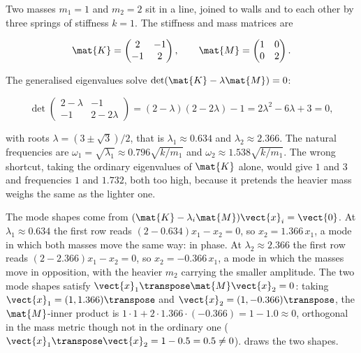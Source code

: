 Two masses $m_{1} = 1$ and $m_{2} = 2$ sit in a line, joined to walls
and to each other by three springs of stiffness $k = 1$. The stiffness
and mass matrices are

\[
\mat{K} = \begin{pmatrix} 2 & -1 \\ -1 & 2 \end{pmatrix}, \qquad
\mat{M} = \begin{pmatrix} 1 & 0 \\ 0 & 2 \end{pmatrix}.
\]

The generalised eigenvalues solve $\det(\mat{K} - \lambda\mat{M}) = 0$:

\[
\det\begin{pmatrix} 2 - \lambda & -1 \\ -1 & 2 - 2\lambda \end{pmatrix}
= (2 - \lambda)(2 - 2\lambda) - 1 = 2\lambda^{2} - 6\lambda + 3 = 0,
\]

with roots $\lambda = (3 \pm \sqrt{3})/2$, that is $\lambda_{1} \approx
0.634$ and $\lambda_{2} \approx 2.366$. The natural frequencies are
$\omega_{1} = \sqrt{\lambda_{1}} \approx 0.796\sqrt{k/m_{1}}$ and
$\omega_{2} \approx 1.538\sqrt{k/m_{1}}$. The wrong shortcut, taking the
ordinary eigenvalues of $\mat{K}$ alone, would give $1$ and $3$ and
frequencies $1$ and $1.732$, both too high, because it pretends the
heavier mass weighs the same as the lighter one.

The mode shapes come from $(\mat{K} - \lambda_{i}\mat{M})\vect{x}_{i} =
\vect{0}$. At $\lambda_{1} \approx 0.634$ the first row reads
$(2 - 0.634)x_{1} - x_{2} = 0$, so $x_{2} = 1.366\,x_{1}$, a mode in
which both masses move the same way: in phase. At $\lambda_{2} \approx
2.366$ the first row reads $(2 - 2.366)x_{1} - x_{2} = 0$, so $x_{2} =
-0.366\,x_{1}$, a mode in which the masses move in opposition, with the
heavier $m_{2}$ carrying the smaller amplitude. The two mode shapes
satisfy $\vect{x}_{1}\transpose\mat{M}\vect{x}_{2} = 0$: taking
$\vect{x}_{1} = (1, 1.366)\transpose$ and $\vect{x}_{2} = (1,
-0.366)\transpose$, the $\mat{M}$-inner product is $1 \cdot 1 + 2 \cdot
1.366 \cdot (-0.366) = 1 - 1.0 \approx 0$, orthogonal in the mass
metric though not in the ordinary one ($\vect{x}_{1}\transpose
\vect{x}_{2} = 1 - 0.5 = 0.5 \neq 0$). 
draws the two shapes.



